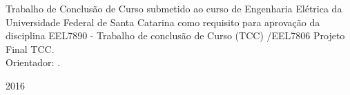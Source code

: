 \begin{titlepage}
  \begin{center}
    {\large \MakeUppercase{\theauthor}}
  \end{center}

  \vfill

  \begin{center}
    {\Large \bfseries \MakeUppercase{\thetitle}}
  \end{center}
  \begin{flushright}
  	\begin{minipage}{0.5\textwidth}
  		Trabalho de Conclusão de Curso submetido ao curso de Engenharia Elétrica da Universidade Federal de Santa Catarina como requisito para aprovação da disciplina EEL7890 - Trabalho de conclusão de Curso (TCC) /EEL7806 Projeto Final TCC.\\ Orientador: \theadvisor.
  	\end{minipage}
  \end{flushright}
  

  \vfill

  \begin{center}
    {\large \bfseries \MakeUppercase{\theplace} \par 2016}
  \end{center}
\end{titlepage}
